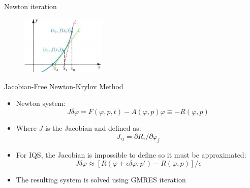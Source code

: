 \documentclass[8pt,xcolor=dvipnames]{beamer}
\newcommand{\be}{\begin{equation*}}
\newcommand{\ee}{\end{equation*}}
\newcommand{\bi}{\begin{itemize}}
\newcommand{\ei}{\end{itemize}}
\begin{document}
\begin{frame}{Newton iteration}
\vspace{-3mm}
\begin{figure}
\includegraphics[height=1.1in]{figures/newton_iter.jpg}
\end{figure}
\vspace{-3mm}
\begin{block}{Jacobian-Free Newton-Krylov Method}
\bi
\item Newton system:
\be
J\delta\varphi = F(\varphi,p,t) - A(\varphi,p)\varphi \equiv -R(\varphi,p)
\ee
\item Where $J$ is the Jacobian and defined as:
\be
J_{ij}=\partial R_i/\partial\varphi_j
\ee
\item For IQS, the Jacobian is impossible to define so it must be approximated:
\be
J\delta\varphi\approx[R(\varphi+\epsilon\delta\varphi,p')-R(\varphi,p)]/\epsilon
\ee
\item The resulting system is solved using GMRES iteration
\ei
\end{block}

\end{frame}
\end{document}
